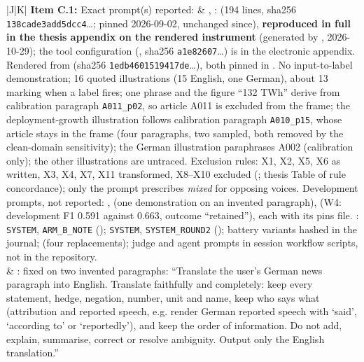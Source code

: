 \documentclass[12pt]{article}
\begin{document}
{\begin{longtable}{|J|K|}
\textbf{Item C.1:} Exact prompt(s) reported:
&
, :  (194 lines, sha256 \texttt{138cade3add5dcc4}\ldots; pinned 2026-09-02, unchanged since), \textbf{reproduced in full in the thesis appendix on the rendered instrument} (generated by , 2026-10-29); the tool configuration (, sha256 \texttt{a1e82607}\ldots) is in the electronic appendix. Rendered from  (sha256 \texttt{1edb4601519417de}\ldots), both pinned in . No input-to-label demonstration; 16 quoted illustrations (15 English, one German), about 13 marking when a label fires; one phrase and the figure ``132 TWh'' derive from calibration paragraph \texttt{A011\_p02}, so article A011 is excluded from the frame; the deployment-growth illustration follows calibration paragraph \texttt{A010\_p15}, whose article stays in the frame (four paragraphs, two sampled, both removed by the clean-domain sensitivity); the German illustration paraphrases A002 (calibration only); the other illustrations are untraced. Exclusion rules: X1, X2, X5, X6 as written, X3, X4, X7, X11 transformed, X8--X10 excluded (; thesis Table of rule concordance); only the prompt prescribes \emph{mixed} for opposing voices. Development prompts, not reported: ,  (one demonstration on an invented paragraph),  (W4: development F1 0.591 against 0.663, outcome ``retained''), each with its pins file. : \texttt{SYSTEM}, \texttt{ARM\_B\_NOTE} (); \texttt{SYSTEM}, \texttt{SYSTEM\_ROUND2} (); battery variants hashed in the journal;  (four replacements); judge and agent prompts in session workflow scripts, not in the repository.
\\[2pt]
& : fixed on two invented paragraphs: ``Translate the user's German news paragraph into English. Translate faithfully and completely: keep every statement, hedge, negation, number, unit and name, keep who says what (attribution and reported speech, e.g. render German reported speech with `said', `according to' or `reportedly'), and keep the order of information. Do not add, explain, summarise, correct or resolve ambiguity. Output only the English translation.''

\end{longtable}}
\end{document}
